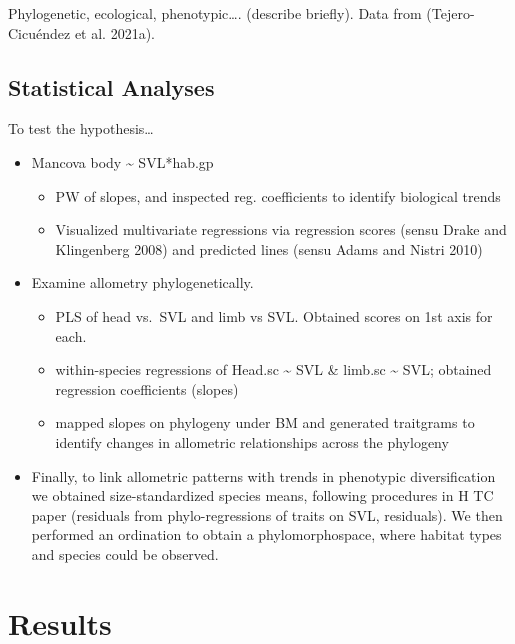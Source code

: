 \documentclass[
]{article}
\providecommand{\tightlist}{%
  \setlength{\itemsep}{0pt}\setlength{\parskip}{0pt}}
\begin{document}
Phylogenetic, ecological, phenotypic\ldots. (describe briefly). Data
from (Tejero-Cicuéndez et al. 2021a).

\hypertarget{statistical-analyses}{%
\subsection{Statistical Analyses}\label{statistical-analyses}}

To test the hypothesis\ldots{}

\begin{itemize}
\tightlist
\item
  Mancova body \textasciitilde{} SVL*hab.gp

  \begin{itemize}
  \tightlist
  \item
    PW of slopes, and inspected reg. coefficients to identify biological
    trends
  \item
    Visualized multivariate regressions via regression scores (sensu
    Drake and Klingenberg 2008) and predicted lines (sensu Adams and
    Nistri 2010)
  \end{itemize}
\item
  Examine allometry phylogenetically.

  \begin{itemize}
  \tightlist
  \item
    PLS of head vs.~SVL and limb vs SVL. Obtained scores on 1st axis for
    each.
  \item
    within-species regressions of Head.sc \textasciitilde{} SVL \&
    limb.sc \textasciitilde{} SVL; obtained regression coefficients
    (slopes)
  \item
    mapped slopes on phylogeny under BM and generated traitgrams to
    identify changes in allometric relationships across the phylogeny
  \end{itemize}
\item
  Finally, to link allometric patterns with trends in phenotypic
  diversification we obtained size-standardized species means, following
  procedures in H TC paper (residuals from phylo-regressions of traits
  on SVL, residuals). We then performed an ordination to obtain a
  phylomorphospace, where habitat types and species could be observed.
\end{itemize}

\hypertarget{results}{%
\section{Results}\label{results}}
\end{document}
